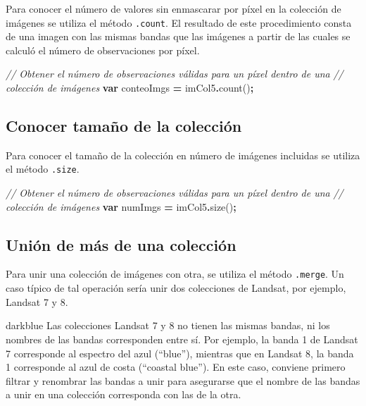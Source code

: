 \documentclass[
  12pt,
  letterpaper,
  twoside]{book}
\newenvironment{Shaded}{\begin{snugshade}}{\end{snugshade}}
\newcommand{\CommentTok}[1]{\textcolor[rgb]{0.56,0.35,0.01}{\textit{#1}}}
\newcommand{\FunctionTok}[1]{\textcolor[rgb]{0.00,0.00,0.00}{#1}}
\newcommand{\KeywordTok}[1]{\textcolor[rgb]{0.13,0.29,0.53}{\textbf{#1}}}
\newcommand{\NormalTok}[1]{#1}
\newcommand{\OperatorTok}[1]{\textcolor[rgb]{0.81,0.36,0.00}{\textbf{#1}}}
\begin{document}
Para conocer el número de valores sin enmascarar por píxel en la colección de imágenes se utiliza el método \texttt{.count}. El resultado de este procedimiento consta de una imagen con las mismas bandas que las imágenes a partir de las cuales se calculó el número de observaciones por píxel.

\begin{Shaded}
\begin{Highlighting}[]
\CommentTok{// Obtener el número de observaciones válidas para un píxel dentro de una }
\CommentTok{// colección de imágenes}
\KeywordTok{var}\NormalTok{ conteoImgs }\OperatorTok{=}\NormalTok{ imCol5}\OperatorTok{.}\FunctionTok{count}\NormalTok{()}\OperatorTok{;}
\end{Highlighting}
\end{Shaded}

\hypertarget{conocer-tamauxf1o-de-la-colecciuxf3n}{%
\subsection{Conocer tamaño de la colección}\label{conocer-tamauxf1o-de-la-colecciuxf3n}}

Para conocer el tamaño de la colección en número de imágenes incluidas se utiliza el método \texttt{.size}.

\begin{Shaded}
\begin{Highlighting}[]
\CommentTok{// Obtener el número de observaciones válidas para un píxel dentro de una }
\CommentTok{// colección de imágenes}
\KeywordTok{var}\NormalTok{ numImgs }\OperatorTok{=}\NormalTok{ imCol5}\OperatorTok{.}\FunctionTok{size}\NormalTok{()}\OperatorTok{;}
\end{Highlighting}
\end{Shaded}

\hypertarget{uniuxf3n-de-muxe1s-de-una-colecciuxf3n}{%
\subsection{Unión de más de una colección}\label{uniuxf3n-de-muxe1s-de-una-colecciuxf3n}}

Para unir una colección de imágenes con otra, se utiliza el método \texttt{.merge}. Un caso típico de tal operación sería unir dos colecciones de Landsat, por ejemplo, Landsat 7 y 8.

\begin{bluebox2}

\begin{awesomeblock}{5pt}{\faLightbulb}{darkblue}
Las colecciones Landsat 7 y 8 no tienen las mismas bandas, ni los nombres de las bandas corresponden entre sí. Por ejemplo, la banda 1 de Landsat 7 corresponde al espectro del azul (``blue''), mientras que en Landsat 8, la banda 1 corresponde al azul de costa (``coastal blue''). En este caso, conviene primero filtrar y renombrar las bandas a unir para asegurarse que el nombre de las bandas a unir en una colección corresponda con las de la otra.

\end{awesomeblock}

\end{bluebox2}
\end{document}
